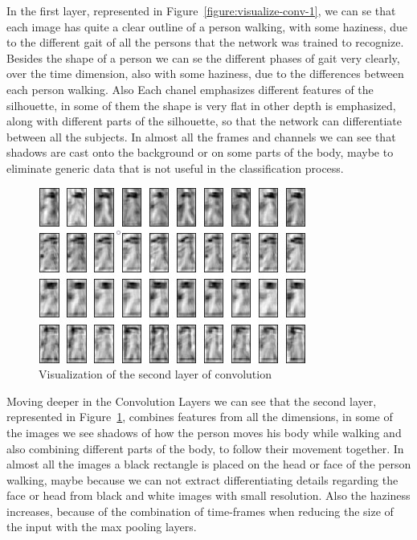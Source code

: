 \documentclass[12pt]{article}
\theoremstyle{definition}
\begin{document}
	In the first layer, represented in Figure~\ref{figure:visualize-conv-1}, we can se that each image has quite a clear outline of a person walking, with some haziness, due to the different gait of all the persons that the network was trained to recognize. Besides the shape of a person we can se the different phases of gait very clearly, over the time dimension, also with some haziness, due to the differences between each person walking. Also Each chanel emphasizes different features of the silhouette, in some of them the shape is very flat in other depth is emphasized, along with different parts of the silhouette, so that the network can differentiate between all the subjects. In almost all the frames and channels we can see that shadows are cast onto the background or on some parts of the body, maybe to eliminate generic data that is not useful in the classification process.

	\begin{figure}[ht]
		\includegraphics[width=\textwidth]{conv-see/visualization-4.jpg}
		\caption{Visualization of the second layer of convolution}
		\label{figure:visualize-conv-2}
	\end{figure}

	Moving deeper in the Convolution Layers we can see that the second layer, represented in Figure~\ref{figure:visualize-conv-2}, combines features from all the dimensions, in some of the images we see shadows of how the person moves his body while walking and also combining different parts of the body, to follow their movement together. In almost all the images a black rectangle is placed on the head or face of the person walking, maybe because we can not extract differentiating details regarding the face or head from black and white images with small resolution. Also the haziness increases, because of the combination of time-frames when reducing the size of the input with the max pooling layers.
\end{document}
